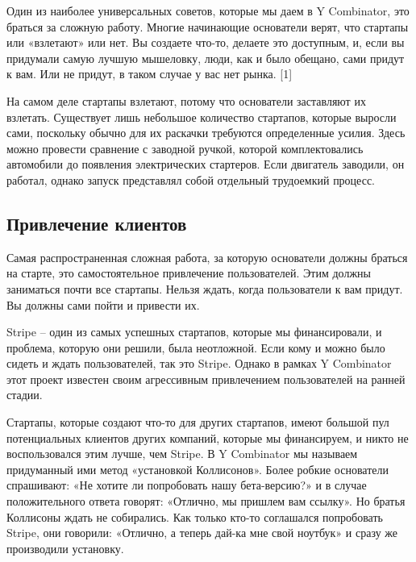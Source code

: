 \documentclass[ebook,12pt,oneside,openany]{memoir}
\author{Пол Грэм} \date{}
\begin{document}
\maketitle

Один из наиболее универсальных советов, которые мы даем в Y
Combinator, это браться за сложную работу. Многие начинающие
основатели верят, что стартапы или «взлетают» или нет. Вы создаете
что-то, делаете это доступным, и, если вы придумали самую лучшую
мышеловку, люди, как и было обещано, сами придут к вам. Или не придут,
в таком случае у вас нет рынка. [1] \newline

На самом деле стартапы взлетают, потому что основатели заставляют их
взлетать. Существует лишь небольшое количество стартапов, которые
выросли сами, поскольку обычно для их раскачки требуются определенные
усилия. Здесь можно провести сравнение с заводной ручкой, которой
комплектовались автомобили до появления электрических стартеров. Если
двигатель заводили, он работал, однако запуск представлял собой
отдельный трудоемкий процесс. \newline

\subsection{Привлечение клиентов}

Самая распространенная сложная работа, за которую основатели должны
браться на старте, это самостоятельное привлечение пользователей. Этим
должны заниматься почти все стартапы. Нельзя ждать, когда пользователи
к вам придут. Вы должны сами пойти и привести их. \newline

Stripe – один из самых успешных стартапов, которые мы финансировали, и
проблема, которую они решили, была неотложной. Если кому и можно было
сидеть и ждать пользователей, так это Stripe. Однако в рамках Y
Combinator этот проект известен своим агрессивным привлечением
пользователей на ранней стадии. \newline

Стартапы, которые создают что-то для других стартапов, имеют большой
пул потенциальных клиентов других компаний, которые мы финансируем, и
никто не воспользовался этим лучше, чем Stripe. В Y Combinator мы
называем придуманный ими метод «установкой Коллисонов». Более робкие
основатели спрашивают: «Не хотите ли попробовать нашу бета-версию?» и
в случае положительного ответа говорят: «Отлично, мы пришлем вам
ссылку». Но братья Коллисоны ждать не собирались. Как только кто-то
соглашался попробовать Stripe, они говорили: «Отлично, а теперь дай-ка
мне свой ноутбук» и сразу же производили установку. \newline
\end{document}
